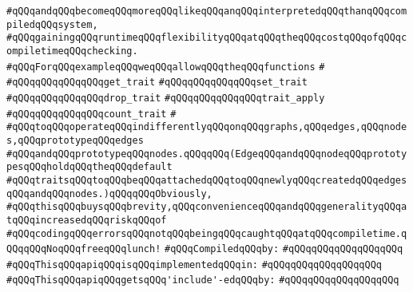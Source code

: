 \verb|#qQQqandqQQqbecomeqQQqmoreqQQqlikeqQQqanqQQqinterpretedqQQqthanqQQqcompiledqQQqsystem,|\newline
\verb|#qQQqgainingqQQqruntimeqQQqflexibilityqQQqatqQQqtheqQQqcostqQQqofqQQqcompiletimeqQQqchecking.|\newline
\verb|#qQQqForqQQqexampleqQQqweqQQqallowqQQqtheqQQqfunctions|\newline
\verb|#|\newline
\verb|#qQQqqQQqqQQqqQQqget_trait|\newline
\verb|#qQQqqQQqqQQqqQQqset_trait|\newline
\verb|#qQQqqQQqqQQqqQQqdrop_trait|\newline
\verb|#qQQqqQQqqQQqqQQqtrait_apply|\newline
\verb|#qQQqqQQqqQQqqQQqcount_trait|\newline
\verb|#|\newline
\verb|#qQQqtoqQQqoperateqQQqindifferentlyqQQqonqQQqgraphs,qQQqedges,qQQqnodes,qQQqprototypeqQQqedges|\newline
\verb|#qQQqandqQQqprototypeqQQqnodes.qQQqqQQq(EdgeqQQqandqQQqnodeqQQqprototypesqQQqholdqQQqtheqQQqdefault|\newline
\verb|#qQQqtraitsqQQqtoqQQqbeqQQqattachedqQQqtoqQQqnewlyqQQqcreatedqQQqedgesqQQqandqQQqnodes.)qQQqqQQqObviously,|\newline
\verb|#qQQqthisqQQqbuysqQQqbrevity,qQQqconvenienceqQQqandqQQqgeneralityqQQqatqQQqincreasedqQQqriskqQQqof|\newline
\verb|#qQQqcodingqQQqerrorsqQQqnotqQQqbeingqQQqcaughtqQQqatqQQqcompiletime.qQQqqQQqNoqQQqfreeqQQqlunch!|\newline
\newline
\verb|#qQQqCompiledqQQqby:|\newline
\verb|#qQQqqQQqqQQqqQQqqQQq|\newline
\newline
\verb|#qQQqThisqQQqapiqQQqisqQQqimplementedqQQqin:|\newline
\verb|#qQQqqQQqqQQqqQQqqQQq|\newline
\newline
\verb|#qQQqThisqQQqapiqQQqgetsqQQq'include'-edqQQqby:|\newline
\verb|#qQQqqQQqqQQqqQQqqQQq|\newline
